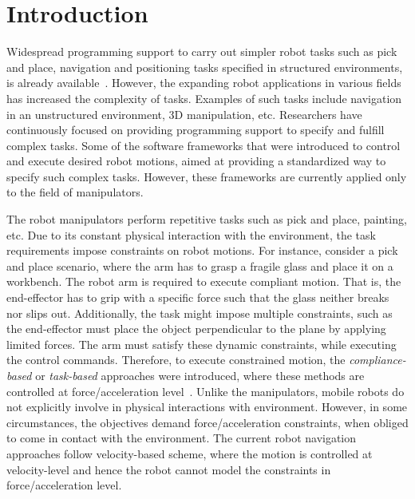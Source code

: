 

	

\chapter{Introduction}
\label{chap:Intro}
Widespread programming support to carry out simpler robot tasks such as pick and place, navigation and positioning tasks specified in structured environments, is already available~\cite{de2007constraint}. However, the expanding robot applications in various fields has increased the complexity of tasks. Examples of such tasks include navigation in an unstructured environment, 3D manipulation, etc. Researchers have continuously focused on providing programming support to specify and fulfill complex tasks. Some of the software frameworks that were introduced to control and execute desired robot motions, aimed at providing a standardized way to specify such complex tasks. However, these frameworks are currently applied only to the field of manipulators. 


The robot manipulators perform repetitive tasks such as pick and place, painting, etc. Due to its constant physical interaction with the environment, the task requirements impose constraints on robot motions. For instance, consider a pick and place scenario, where the arm has to grasp a fragile glass and place it on a workbench. The robot arm is required to execute compliant motion. That is, the end-effector has to grip with a specific force such that the glass neither breaks nor slips out. Additionally, the task might impose multiple constraints, such as the end-effector must place the object perpendicular to the plane by applying limited forces. The arm must satisfy these dynamic constraints, while executing the control commands. Therefore, to execute constrained motion, the \textit{compliance-based} or \textit{task-based} approaches were introduced, where these methods are controlled at force/acceleration level~\cite{han2017interaction}. Unlike the manipulators, mobile robots do not explicitly involve in physical interactions with environment. However, in some circumstances, the objectives demand force/acceleration constraints, when obliged to come in contact with the environment. The current robot navigation approaches follow velocity-based scheme, where the motion is controlled at velocity-level and hence the robot cannot model the constraints in force/acceleration level. 

